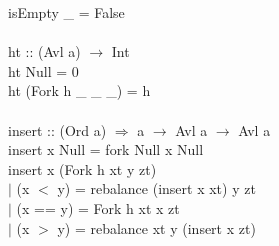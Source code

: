 \documentclass[11pt]{article}
\begin{document}
\begin{smallprogram*}
\>  isEmpty \_ = False \\
\> \\
\>  ht :: (Avl a) $\rightarrow$ Int \\
\>  ht Null = 0 \\
\>  ht (Fork h \_ \_ \_) = h \\
\> \\
\>  insert :: (Ord a) $\Rightarrow$ a $\rightarrow$ Avl a $\rightarrow$ Avl a \\
\>  insert x Null = fork Null x Null \\
\>  insert x (Fork h xt y zt)  \\
\>    $\mid$ (x $<$ y) = rebalance (insert x xt) y zt \\
\>    $\mid$ (x == y) = Fork h xt x zt \\
\>    $\mid$ (x $>$ y) = rebalance xt y (insert x zt) \\
\end{smallprogram*}
\newpage
\end{document}
